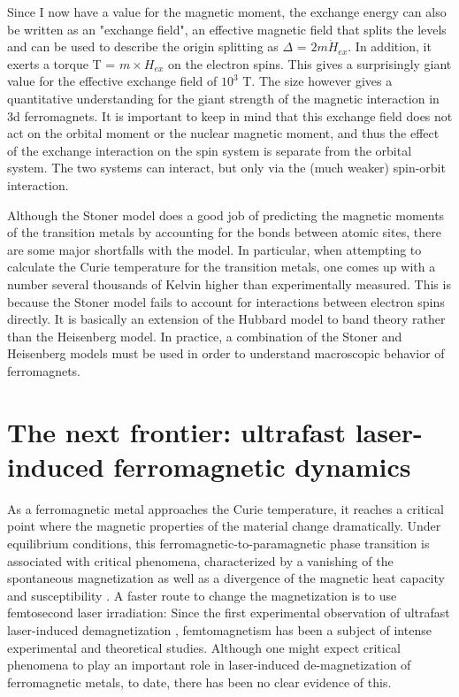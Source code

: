 Since I now have a value for the magnetic moment, the exchange energy can also be written as an "exchange field", an effective magnetic field that splits the levels and can be used to describe the origin splitting as $\Delta$ = $2m\dot H_{ex}$. In addition, it exerts a torque T = $m\times H_{ex}$ on the electron spins. This gives a surprisingly giant value for the effective exchange field of $10^3$ T. The size however gives a quantitative understanding for the giant strength of the magnetic interaction in 3d ferromagnets. It is important to keep in mind that this exchange field does not act on the orbital moment or the nuclear magnetic moment, and thus the effect of the exchange interaction on the spin system is separate from the orbital system. The two systems can interact, but only via the (much weaker) spin-orbit interaction.

Although the Stoner model does a good job of predicting the magnetic moments of the transition metals by accounting for the bonds between atomic sites, there are some major shortfalls with the model. In particular, when attempting to calculate the Curie temperature for the transition metals, one comes up with a number several thousands of Kelvin higher than experimentally measured. This is because the Stoner model fails to account for interactions between electron spins directly. It is basically an extension of the Hubbard model to band theory rather than the Heisenberg model. In practice, a combination of the Stoner and Heisenberg models must be used in order to understand macroscopic behavior of ferromagnets.

\section{The next frontier: ultrafast laser-induced ferromagnetic dynamics}

As a ferromagnetic metal approaches the Curie temperature, it reaches a critical point where the magnetic properties of the material change dramatically. Under equilibrium conditions, this ferromagnetic-to-paramagnetic phase transition is associated with critical phenomena, characterized by a vanishing of the spontaneous magnetization as well as a divergence of the magnetic heat capacity and susceptibility \cite{Stohr2006}. A faster route to change the magnetization is to use femtosecond laser irradiation: Since the first experimental observation of ultrafast laser-induced demagnetization \cite{E.BeaupaireJ-CMerleA.Daunois1996}, femtomagnetism has been a subject of intense experimental and theoretical studies. Although one might expect critical phenomena to play an important role in laser-induced de-magnetization of ferromagnetic metals, to date, there has been no clear evidence of this.

